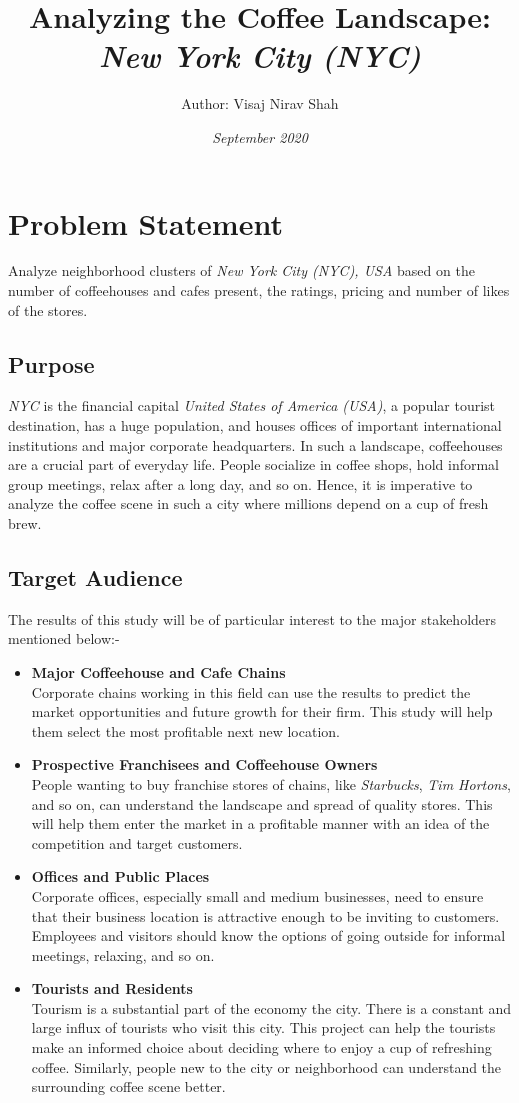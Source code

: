 \documentclass{article}
\title{\textbf{Analyzing the Coffee Landscape: \\\textit{New York City (NYC)}}}
\author{Author: Visaj Nirav Shah}
\date{\emph{September 2020}}
\begin{document}
\maketitle

\section{Problem Statement}
{Analyze neighborhood clusters of \textit{New York City (NYC), USA} based on the number of coffeehouses and cafes present, the ratings, pricing and number of likes of the stores.}
\subsection{Purpose}
{\textit{NYC} is the financial capital \textit{United States of America (USA)}, a popular tourist destination, has a huge population, and houses offices of important international institutions and major corporate headquarters. In such a landscape, coffeehouses are a crucial part of everyday life. People socialize in coffee shops, hold informal group meetings, relax after a long day, and so on. Hence, it is imperative to analyze the coffee scene in such a city where millions depend on a cup of fresh brew.}
\subsection{Target Audience}
{The results of this study will be of particular interest to the major stakeholders mentioned below:-}
\begin{itemize}
    \item \textbf{Major Coffeehouse and Cafe Chains}\\{Corporate chains working in this field can use the results to predict the market opportunities and future growth for their firm. This study will help them select the most profitable next new location.}
    \item \textbf{Prospective Franchisees and Coffeehouse Owners}\\{People wanting to buy franchise stores of chains, like \textit{Starbucks}, \textit{Tim Hortons}, and so on, can understand the landscape and spread of quality stores. This will help them enter the market in a profitable manner with an idea of the competition and target customers.}
    \pagebreak
    \item \textbf{Offices and Public Places}\\{Corporate offices, especially small and medium businesses, need to ensure that their business location is attractive enough to be inviting to customers. Employees and visitors should know the options of going outside for informal meetings, relaxing, and so on.}
    \item \textbf{Tourists and Residents}\\{Tourism is a substantial part of the economy the city. There is a constant and large influx of tourists who visit this city. This project can help the tourists make an informed choice about deciding where to enjoy a cup of refreshing coffee. Similarly, people new to the city or neighborhood can understand the surrounding coffee scene better.}
\end{itemize}
\end{document}
